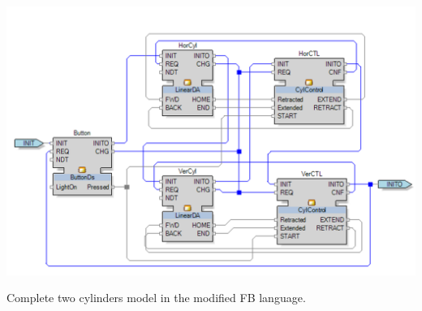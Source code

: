 \documentclass[runningheads]{llncs}
\begin{document}
\begin {figure*}
    \centering
    \includegraphics [width = 0.8 \textwidth] {images/twocylindersfb.PNG}
    \caption {Complete two cylinders model in the modified FB language.}
    \label {fig:twocylindersfb}
\end {figure*}


\end{document}
